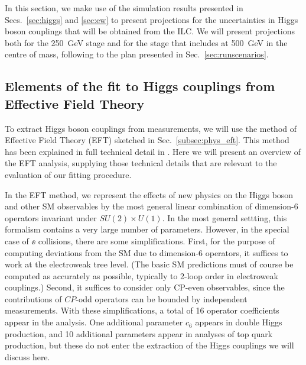 

In this section, we make use of the simulation results presented in
Secs.~\ref{sec:higgs} and \ref{sec:ew} to present projections for the
uncertainties in Higgs boson couplings that will be obtained from the
ILC.  We will present projections both for the 250~GeV stage and for
the stage that includes at 500~GeV in the centre of mass, following
to the plan presented in Sec.~\ref{sec:runscenarios}.   


\subsection{Elements of the fit to Higgs couplings from Effective Field Theory}
\label{subsec:global:elements}
 


To extract
Higgs boson couplings from measurements, we will use the method of
Effective Field Theory (EFT) sketched in Sec.~\ref{subsec:phys_eft}.
This method has been explained in full technical  detail in
\cite{Barklow:2017suo,Barklow:2017awn}.
Here we will present an overview of the EFT analysis, supplying those 
technical details that are relevant to the evaluation of our fitting procedure.

In the EFT method, we represent the effects of new physics on the
Higgs boson and other SM observables by the most general linear
combination of dimension-6 operators invariant under $SU(2)\times
U(1)$.  In the most general settting, this formalism contains a very large
number of parameters.  However, in the special case of $\ee$
collisions, there are some simplifications.   First, for the purpose
of computing deviations from the SM due to dimension-6 operators, it
suffices to work at the electroweak tree level.   (The basic SM
predictions must of course be computed as accurately as possible,
typically to 2-loop order in electroweak couplings.)  Second, it
suffices to consider only CP-even observables, since the 
 contributions of $CP$-odd operators can be bounded
 by independent measurements.   With these simplifications, a total of
 16 operator coefficients appear in the analysis.  One additional
 parameter $c_6$ appears in double Higgs production, and 10 additional
 parameters appear in analyses of top quark production, but these do
 not enter the extraction of the Higgs couplings we will discuss here.

